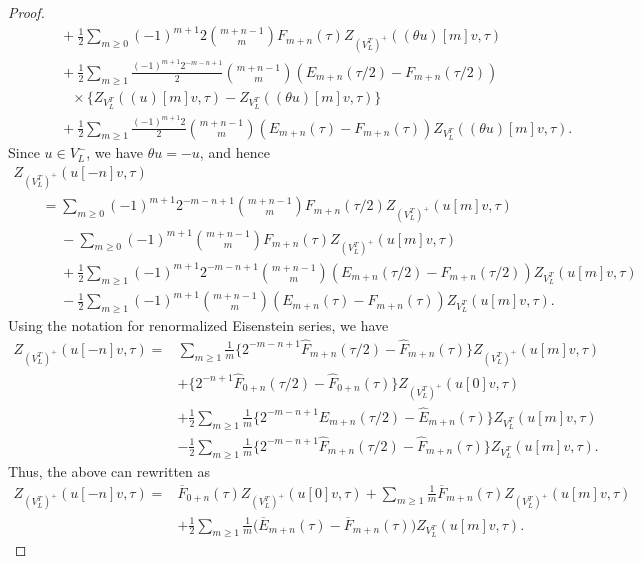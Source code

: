 \documentclass[10pt,a4paper]{amsart}
\begin{document}
\begin{proof}
\begin{gather*}
\phantom{\qquad=}{}+\frac{1}{2}\sum_{m\geq 0}(-1)^{m+1}2\binom{m+n-1}{m}F_{m+n}(\tau) Z_{(V_L^T)^+}((\theta u)[m]v,\tau)\\
\phantom{\qquad=}{}
+ \frac{1}{2} \sum_{m \geq 1} \frac{(-1)^{m+1} 2^{-m-n+1}}{2} \binom{m+n-1}{m} ( E_{m+n}(\tau/2) - F_{m+n}(\tau/2) ) \\
\phantom{\qquad=+}{}\times \{ Z_{V_L^T}((u)[m]v, \tau) - Z_{V_L^T}((\theta u)[m]v, \tau) \}
\\
\phantom{\qquad=}{}+\frac{1}{2}\sum_{m\geq 1}\frac{(-1)^{m+1}2}{2}\binom{m+n-1}{m}(E_{m+n}(\tau)-F_{m+n}(\tau))Z_{V_L^T}((\theta u)[m]v, \tau).
\end{gather*}
Since $u\in V_L^-$, we have $\theta u=-u$, and hence
\begin{gather*}
Z_{(V_L^T)^+}(u[-n]v,\tau)\\
\qquad=\sum_{m\geq 0}(-1)^{m+1}2^{-m-n+1}\binom{m+n-1}{m}F_{m+n}(\tau/2) Z_{(V_L^T)^+}(u[m]v,\tau)\\
\phantom{\qquad=}{}-\sum_{m\geq 0}(-1)^{m+1}\binom{m+n-1}{m}F_{m+n}(\tau) Z_{(V_L^T)^+}(u[m]v,\tau)\\
\phantom{\qquad=}{}+\frac{1}{2}\sum_{m\geq 1}(-1)^{m+1}2^{-m-n+1}\binom{m+n-1}{m}(E_{m+n}(\tau/2)-F_{m+n}(\tau/2))Z_{V_L^T}(u[m]v, \tau)\\
\phantom{\qquad=}{}-\frac{1}{2}\sum_{m\geq 1}(-1)^{m+1}\binom{m+n-1}{m}(E_{m+n}(\tau)-F_{m+n}(\tau))Z_{V_L^T}(u[m]v, \tau).
\end{gather*}
Using the notation for renormalized Eisenstein series, we have
\begin{align*}
Z_{(V_L^T)^+}(u[-n]v,\tau)={}&\sum_{m\geq 1}\frac{1}{m}\bigl\{2^{-m-n+1}\hat{F}_{m+n}(\tau/2) -\hat{F}_{m+n}(\tau)\bigr\}Z_{(V_L^T)^+}(u[m]v,\tau)\\
&+\bigl\{2^{-n+1}\hat{F}_{0+n}(\tau/2) -\hat{F}_{0+n}(\tau)\bigr\}Z_{(V_L^T)^+}(u[0]v,\tau)\\
&+\frac{1}{2}\sum_{m\geq 1}\frac{1}{m}\bigl\{2^{-m-n+1}\hat{E}_{m+n}(\tau/2) -\hat{E}_{m+n}(\tau)\bigr\}Z_{V_L^T}(u[m]v, \tau)\\
&-\frac{1}{2}\sum_{m\geq 1}\frac{1}{m}\bigl\{2^{-m-n+1}\hat{F}_{m+n}(\tau/2) -\hat{F}_{m+n}(\tau)\bigr\}Z_{V_L^T}(u[m]v, \tau).
\end{align*}
Thus, the above can rewritten as
\begin{align*}
Z_{(V_L^T)^+}(u[-n]v,\tau)={}& \overline{F}_{0+n}(\tau)Z_{(V_L^T)^+}(u[0]v,\tau)+\sum_{m\geq 1}\frac{1}{m}\overline{F}_{m+n}(\tau)Z_{(V_L^T)^+}(u[m]v,\tau)\\
& +\frac{1}{2}\sum_{m\geq 1}\frac{1}{m}\bigl(\overline{E}_{m+n}(\tau)-\overline{F}_{m+n}(\tau)\bigr)Z_{V_L^T}(u[m]v, \tau).\tag*{\qed}
\end{align*}\renewcommand{\qed}{}
\end{proof}
\end{document}
